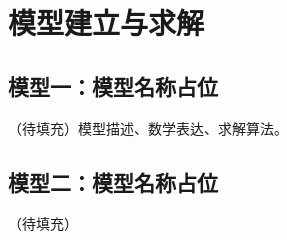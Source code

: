 
\section{模型建立与求解}\label{sec:model}


\subsection{模型一：模型名称占位}\label{sec:model1}

\noindent （待填充）模型描述、数学表达、求解算法。


\subsection{模型二：模型名称占位}\label{sec:model2}

\noindent （待填充）


